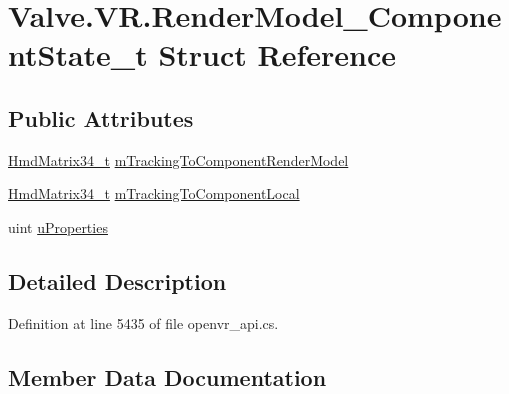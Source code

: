 \hypertarget{struct_valve_1_1_v_r_1_1_render_model___component_state__t}{}\section{Valve.\+V\+R.\+Render\+Model\+\_\+\+Component\+State\+\_\+t Struct Reference}
\label{struct_valve_1_1_v_r_1_1_render_model___component_state__t}
\subsection*{Public Attributes}
\begin{DoxyCompactItemize}
\item 
\mbox{\hyperlink{struct_valve_1_1_v_r_1_1_hmd_matrix34__t}{Hmd\+Matrix34\+\_\+t}} \mbox{\hyperlink{struct_valve_1_1_v_r_1_1_render_model___component_state__t_a55ef2d1230407eb02524c200b515ef3c}{m\+Tracking\+To\+Component\+Render\+Model}}
\item 
\mbox{\hyperlink{struct_valve_1_1_v_r_1_1_hmd_matrix34__t}{Hmd\+Matrix34\+\_\+t}} \mbox{\hyperlink{struct_valve_1_1_v_r_1_1_render_model___component_state__t_a90bf32416debc2a22731e72cac61bea5}{m\+Tracking\+To\+Component\+Local}}
\item 
uint \mbox{\hyperlink{struct_valve_1_1_v_r_1_1_render_model___component_state__t_a629c200025bca9adee21f5d68927468f}{u\+Properties}}
\end{DoxyCompactItemize}


\subsection{Detailed Description}


Definition at line 5435 of file openvr\+\_\+api.\+cs.



\subsection{Member Data Documentation}
\mbox{\label{struct_valve_1_1_v_r_1_1_render_model___component_state__t_a90bf32416debc2a22731e72cac61bea5}} 
